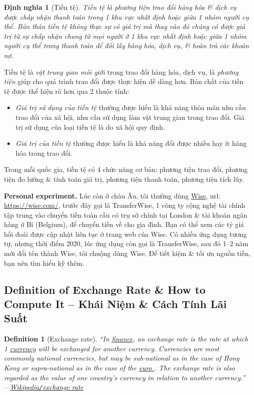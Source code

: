 \documentclass{article}
\newtheorem{definition}{Definition}
\newtheorem{dinhnghia}{Định nghĩa}
\begin{document}
\begin{dinhnghia}[Tiền tệ]
	\emph{Tiền tệ} là phương tiện trao đổi hàng hóa \& dịch vụ được chấp nhận thanh toán trong 1 khu vực nhất định hoặc giữa 1 nhóm người cụ thể. Bản thân tiền tệ không thực sự có giá trị mà thay vào đó chúng có được giá trị từ sự chấp nhận chung từ mọi người ở 1 khu vực nhất định hoặc giữa 1 nhóm người cụ thể trong thanh toán để đổi lấy hàng hóa, dịch vụ, \& hoàn trả các khoản nợ.
\end{dinhnghia}
Tiền tệ là {\it vật trung gian môi giới} trong trao đổi hàng hóa, dịch vụ, là {\it phương tiện} giúp cho quá trình trao đổi được thực hiện dễ dàng hơn. Bản chất của tiền tệ được thể hiện rõ hơn qua 2 thuộc tính:
\begin{itemize}
	\item {\it Giá trị sử dụng của tiền tệ} thường được hiểu là khả năng thỏa mãn nhu cầu trao đổi của xã hội, nhu cầu sử dụng làm vật trung gian trong trao đổi. Giá trị sử dụng của loại tiền tệ là do xã hội quy định.
	\item {\it Giá trị của tiền tệ} thường được hiểu là khả năng đổi được nhiều hay ít hàng hóa trong trao đổi.
\end{itemize}
Trong mỗi quốc gia, tiền tệ có 4 chức năng cơ bản: phương tiện trao đổi, phương tiện đo lường \& tính toán giá trị, phương tiện thanh toán, phương tiện tích lũy.

{\bf Personal experiment.} Lúc còn ở châu Âu, tôi thường dùng \href{https://wise.com/}{Wise}, {\sc url}: \url{https://wise.com/}, trước đây gọi là TransferWise, 1 công ty cộng nghệ tài chính tập trung vào chuyển tiền toàn cầu có trụ sở chính tại London \& tài khoản ngân hàng ở Bỉ (Belgium), để chuyển tiền về cho gia đình. Bạn có thể xem các tỷ giá hối đoái được cập nhật liên tục ở trang web của Wise. Có nhiều ứng dụng tương tự, nhưng thời điểm 2020, lúc ứng dụng còn gọi là TransferWise, sau đó 1--2 năm mới đổi tên thành Wise, tôi chuộng dùng Wise. Để tiết kiệm \& tối ưu nguồn tiền, bạn nên tìm hiểu kỹ thêm.


\subsection{Definition of Exchange Rate \& How to Compute It -- Khái Niệm \& Cách Tính Lãi Suất}

\begin{definition}[Exchange rate]
	``In \href{https://en.wikipedia.org/wiki/Finance}{finance}, an \emph{exchange rate} is the rate at which 1 \href{https://en.wikipedia.org/wiki/Currency}{currency} will be exchanged for another currency. Currencies are most commonly national currencies, but may be sub-national as in the case of Hong Kong or supra-national as in the case of the \href{https://en.wikipedia.org/wiki/Euro}{euro \texteuro}. The exchange rate is also regarded as the value of one country's currency in relation to another currency.'' -- \href{https://en.wikipedia.org/wiki/Exchange_rate}{Wikipedia{\tt/}exchange rate}
\end{definition}
\end{document}
